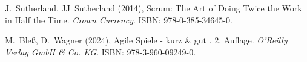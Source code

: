 \documentclass[5pt, final]{beamer}
\begin{document}
\begin{frame}[t]
\begin{multicols}{3}
\begin{thebibliography}{99}
                 J.~Sutherland, JJ~Sutherland (2014), Scrum: The Art of Doing Twice the Work in Half the Time. \textit{Crown Currency}. ISBN: 978-0-385-34645-0.
                
                 M.~Bleß, D.~Wagner (2024), Agile Spiele - kurz \& gut . 2. Auflage. \textit{O'Reilly Verlag GmbH \& Co. KG}. ISBN: 978-3-960-09249-0.
				
			\end{thebibliography}
			
		\end{multicols}
		
	\end{frame}
\end{document}
